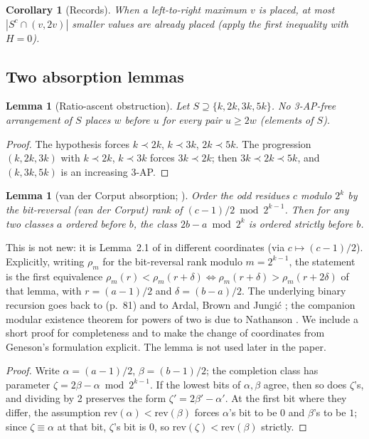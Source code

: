 \documentclass[11pt]{article}
\newtheorem{lemma}[theorem]{Lemma}
\newtheorem{corollary}[theorem]{Corollary}
\theoremstyle{definition}
\begin{document}
\begin{corollary}[Records]\label{cor:records}
When a left-to-right maximum $v$ is placed, at most $|S^c \cap (v,2v)|$
smaller values are already placed (apply the first inequality with $H = 0$).
\end{corollary}

\subsection{Two absorption lemmas}

\begin{lemma}[Ratio-ascent obstruction]\label{lem:R}
Let $S \supseteq \{k, 2k, 3k, 5k\}$. No 3-AP-free arrangement of $S$ places $w$
before $u$ for every pair $u \ge 2w$ (elements of $S$).
\end{lemma}

\begin{proof}
The hypothesis forces $k \prec 2k$, $k \prec 3k$, $2k \prec 5k$. The progression
$(k,2k,3k)$ with $k \prec 2k$, $k \prec 3k$ forces $3k \prec 2k$; then
$3k \prec 2k \prec 5k$, and $(k,3k,5k)$ is an increasing 3-AP.
\end{proof}

\begin{lemma}[van der Corput absorption; \cite{Gen26}]\label{thm:vdc}
Order the odd residues $c$ modulo $2^k$ by the bit-reversal (van der Corput) rank
of $(c-1)/2 \bmod 2^{k-1}$. Then for any two classes $a$ ordered before $b$, the
class $2b - a \bmod 2^k$ is ordered strictly before $b$.
\end{lemma}

\noindent This is not new: it is Lemma~2.1 of \cite{Gen26} in different
coordinates (via $c \mapsto (c-1)/2$). Explicitly, writing $\rho_m$ for the
bit-reversal rank modulo $m = 2^{k-1}$, the statement is the first
equivalence
$\rho_m(r) < \rho_m(r+\delta) \iff \rho_m(r+\delta) > \rho_m(r+2\delta)$
of that lemma, with $r = (a-1)/2$ and $\delta = (b-a)/2$. The underlying
binary recursion goes back to \cite{DEGS77} (p.~81) and to
Ardal, Brown and Jungi\'c \cite{ABJ11}; the companion modular existence
theorem for powers of two is due to Nathanson \cite{Nat77}. We include a
short proof for completeness and to make the change of coordinates from
Geneson's formulation explicit. The lemma is not used later in the paper.

\begin{proof}
Write $\alpha = (a-1)/2$, $\beta = (b-1)/2$; the completion class has parameter
$\zeta = 2\beta - \alpha \bmod 2^{k-1}$. If the lowest bits of $\alpha,\beta$
agree, then so does $\zeta$'s, and dividing by 2 preserves the form
$\zeta' = 2\beta' - \alpha'$. At the first bit where they differ, the assumption
$\mathrm{rev}(\alpha) < \mathrm{rev}(\beta)$ forces $\alpha$'s bit to be $0$ and
$\beta$'s to be $1$; since $\zeta \equiv \alpha$ at that bit, $\zeta$'s bit is
$0$, so $\mathrm{rev}(\zeta) < \mathrm{rev}(\beta)$ strictly.
\end{proof}
\end{document}

